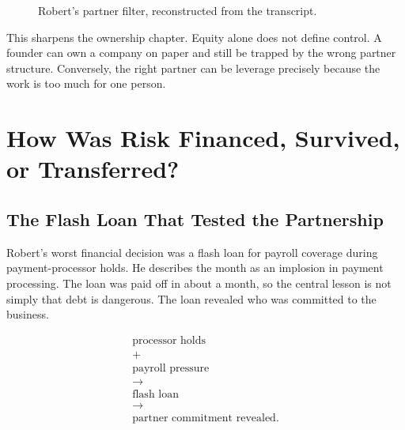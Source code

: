 \documentclass[11pt,oneside]{book}
\begin{document}
\begin{figure}
\centering
{}
\caption{Robert's partner filter, reconstructed from the transcript.}
\end{figure}

This sharpens the ownership chapter. Equity alone does not define control. A founder can own a company on paper and still be trapped by the wrong partner structure. Conversely, the right partner can be leverage precisely because the work is too much for one person.

\chapter{How Was Risk Financed, Survived, or Transferred?}

\section{The Flash Loan That Tested the Partnership}

Robert's worst financial decision was a flash loan for payroll coverage during payment-processor holds. He describes the month as an implosion in payment processing. The loan was paid off in about a month, so the central lesson is not simply that debt is dangerous. The loan revealed who was committed to the business.

\begin{equation}
\begin{gathered}
\text{processor holds}\\
+\\
\text{payroll pressure}\\
\longrightarrow\\
\text{flash loan}\\
\longrightarrow\\
\text{partner commitment revealed}.
\end{gathered}
\end{equation}
\end{document}
